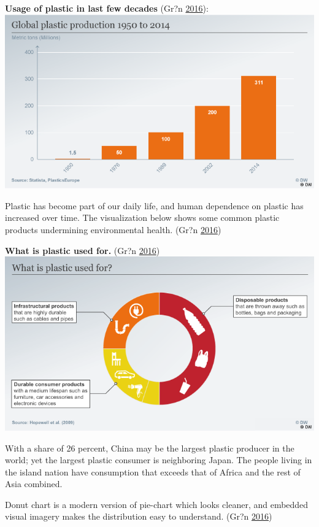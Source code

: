 \documentclass[]{book}
\theoremstyle{definition}
\theoremstyle{definition}
\theoremstyle{definition}
\theoremstyle{remark}
\begin{document}
\textbf{Usage of plastic in last few decades} (Gr?n
\protect\hyperlink{ref-plastic_pollution_visualizations}{2016}):
\includegraphics{images/global_plastic_usage.png}

Plastic has become part of our daily life, and human dependence on
plastic has increased over time. The visualization below shows some
common plastic products undermining environmental health. (Gr?n
\protect\hyperlink{ref-plastic_pollution_visualizations}{2016})

\textbf{What is plastic used for.} (Gr?n
\protect\hyperlink{ref-plastic_pollution_visualizations}{2016})
\includegraphics{images/use_of_plastic.png}

With a share of 26 percent, China may be the largest plastic producer in
the world; yet the largest plastic consumer is neighboring Japan. The
people living in the island nation have consumption that exceeds that of
Africa and the rest of Asia combined.

Donut chart is a modern version of pie-chart which looks cleaner, and
embedded visual imagery makes the distribution easy to understand. (Gr?n
\protect\hyperlink{ref-plastic_pollution_visualizations}{2016})
\end{document}
